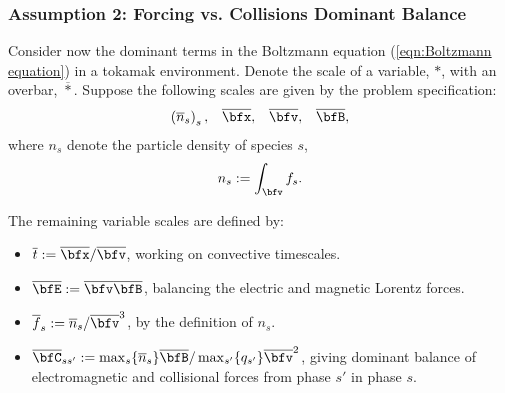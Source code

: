 \subsubsection*{Assumption 2: Forcing vs. Collisions Dominant Balance}
    Consider now the dominant terms in the Boltzmann equation (\ref{eqn:Boltzmann equation}) in a tokamak environment. Denote the scale of a variable, $*$, with an overbar, $\overline{*}$. Suppose the following scales are given by the problem specification:
    \begin{align}
        \left(\overline{n}_{s}\right)_{s},         &&
        \overline{\bfx},                           &&
        \overline{\bfv},                           &&
        \overline{\bfB},
    \end{align}
    where $n_{s}$ denote the particle density of species $s$,
    \begin{equation}
        n_{s}  :=  \int_{\bfv}f_{s}.
    \end{equation}

    
    The remaining variable scales are defined by:
    \begin{itemize}
        \item  $\overline{t}           :=  \overline{\bfx}/\overline{\bfv}$, working on convective timescales.
        \item  $\overline{\bfE}        :=  \overline{\bfv}\overline{\bfB}$, balancing the electric and magnetic Lorentz forces. 
        \item  $\overline{f}_{s}       :=  \overline{n}_{s}/\overline{\bfv}^{3}$, by the definition of $n_{s}$.
        \item  $\overline{\bfC}_{ss'}  :=  \max_{s}\{\overline{n}_{s}\}\overline{\bfB}/\max_{s'}\{q_{s'}\}\overline{\bfv}^{2}$, giving dominant balance of electromagnetic and collisional forces from phase $s'$ in phase $s$. 
    \end{itemize}
    
